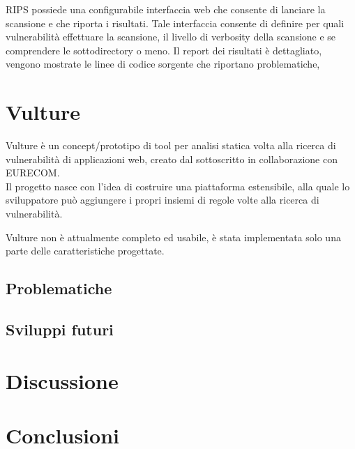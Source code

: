RIPS possiede una configurabile interfaccia web che consente di lanciare la scansione e che riporta i risultati. Tale interfaccia consente di definire per quali vulnerabilità effettuare la scansione, il livello di verbosity della scansione e se comprendere le sottodirectory o meno. Il report dei risultati è dettagliato, vengono mostrate le linee di codice sorgente che riportano problematiche,  

\chapter{Vulture}
Vulture è un concept/prototipo di tool per analisi statica volta alla ricerca di vulnerabilità di applicazioni web, creato dal sottoscritto in collaborazione con EURECOM.\\
Il progetto nasce con l'idea di costruire una piattaforma estensibile, alla quale lo sviluppatore può aggiungere i propri insiemi di regole volte alla ricerca di vulnerabilità. 

Vulture non è attualmente completo ed usabile, è stata implementata solo una parte delle caratteristiche progettate. 


\section{Problematiche}

\section{Sviluppi futuri}

\chapter{Discussione}

\chapter{Conclusioni}